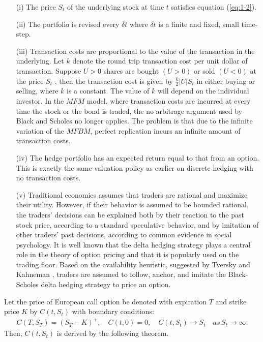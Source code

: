 \documentclass[a4paper,11pt]{amsart}
\numberwithin{equation}{section}
\theoremstyle{definition}
\theoremstyle{plain}
\theoremstyle{definition}
\newcommand{\1}{\mathbf{1}}
\begin{document}
\begin{enumerate}

\item[(i)] The price $S_t$ of the underlying stock at time $t$ satisfies equation (\ref{eq:1-2}).


\item[(ii)] The portfolio is revised every $\delta t$ where $\delta t$ is a finite and fixed, small time-step.


\item[(iii)]
Transaction costs are proportional to the value of the transaction in the underlying. Let $k$ denote the round trip
transaction cost per unit dollar of transaction. Suppose $U>0$ shares are bought $(U>0)$ or sold $(U<0)$ at the price $S_t$ , then
the transaction cost is given by
$\frac{k}{2}|U|S_t$ in either buying or selling, where $k$ is a constant. The value of $k$ will depend on the
individual investor. In the $MFM$ model, where transaction costs are incurred at every time the
stock or the bond is traded, the no arbitrage argument used by Black and Scholes no longer applies. The problem is that due
to the infinite variation of the $MFBM$, perfect replication incurs an infinite amount of transaction costs.

\item[(iv)] The hedge portfolio has an expected return equal to that from an option. This is exactly the same valuation policy as
earlier on discrete hedging with no transaction costs.

\item[(v)] Traditional economics assumes that traders are rational and maximize their utility. However, if their behavior is
assumed to be bounded rational, the traders' decisions can be explained both by their reaction to the past stock price, according
to a standard speculative behavior, and by imitation of other traders' past decisions, according to common evidence in
social psychology. It is well known that the delta hedging strategy plays a central role in the theory of option pricing and
that it is popularly used on the trading floor. Based on the availability heuristic, suggested by Tversky and Kahneman \cite{tversky},
traders are assumed to follow, anchor, and imitate the Black-Scholes delta hedging strategy to price an option.

\end{enumerate}



Let the price of European call option be denoted with expiration $T$ and strike price $K$ by $C(t,S_t)$ with boundary conditions:
\begin{eqnarray}
C(T,S_T)=(S_T-K)^+, \quad C(t,0)=0,\quad C(t,S_t)\rightarrow S_t\quad as \, S_t\rightarrow\infty.
\label{eq:2}
\end{eqnarray}
Then, $C(t,S_t)$ is derived by the following theorem.\\
\end{document}
